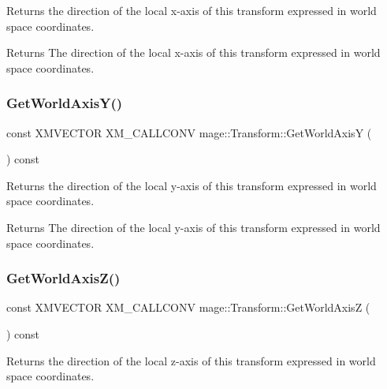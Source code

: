 Returns the direction of the local x-\/axis of this transform expressed in world space coordinates.

\begin{DoxyReturn}{Returns}
The direction of the local x-\/axis of this transform expressed in world space coordinates. 
\end{DoxyReturn}
\hypertarget{classmage_1_1_transform_ab62a58130aae5e4094b9d6455b4b2561}{}\label{classmage_1_1_transform_ab62a58130aae5e4094b9d6455b4b2561} 
\subsubsection{\texorpdfstring{Get\+World\+Axis\+Y()}{GetWorldAxisY()}}
{\footnotesize\ttfamily const X\+M\+V\+E\+C\+T\+OR X\+M\+\_\+\+C\+A\+L\+L\+C\+O\+NV mage\+::\+Transform\+::\+Get\+World\+AxisY (\begin{DoxyParamCaption}{ }\end{DoxyParamCaption}) const\hspace{0.3cm}{\ttfamily [noexcept]}}

Returns the direction of the local y-\/axis of this transform expressed in world space coordinates.

\begin{DoxyReturn}{Returns}
The direction of the local y-\/axis of this transform expressed in world space coordinates. 
\end{DoxyReturn}
\hypertarget{classmage_1_1_transform_a7be63b8fa0f661504404c33572b1c66b}{}\label{classmage_1_1_transform_a7be63b8fa0f661504404c33572b1c66b} 
\subsubsection{\texorpdfstring{Get\+World\+Axis\+Z()}{GetWorldAxisZ()}}
{\footnotesize\ttfamily const X\+M\+V\+E\+C\+T\+OR X\+M\+\_\+\+C\+A\+L\+L\+C\+O\+NV mage\+::\+Transform\+::\+Get\+World\+AxisZ (\begin{DoxyParamCaption}{ }\end{DoxyParamCaption}) const\hspace{0.3cm}{\ttfamily [noexcept]}}

Returns the direction of the local z-\/axis of this transform expressed in world space coordinates.

